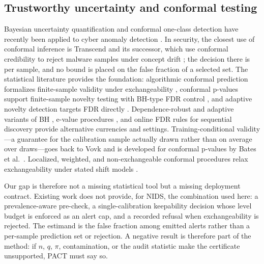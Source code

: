 \documentclass[a4paper,fleqn]{cas-dc}
\newcommand{\PACT}{PACT\xspace}
\begin{document}
\subsection{Trustworthy uncertainty and conformal testing}
Bayesian uncertainty quantification and conformal one-class detection have recently been applied to cyber anomaly detection \cite{yang2024trustworthy,farsimadan2026confid,uq2024nids,comnet2025bayesian}. In security, the closest use of conformal inference is Transcend and its successor, which use conformal credibility to reject malware samples under concept drift \cite{jordaney2017transcend,barbero2022transcending}; the decision there is per sample, and no bound is placed on the false fraction of a selected set. The statistical literature provides the foundation: algorithmic conformal prediction formalizes finite-sample validity under exchangeability \cite{vovk2005algorithmic}, conformal p-values support finite-sample novelty testing with BH-type FDR control \cite{bates2023outliers,benjamini1995controlling}, and adaptive novelty detection targets FDR directly \cite{aos2024adaptive}. Dependence-robust and adaptive variants of BH \cite{benjamini2001yekutieli,storey2002direct,biomet2025null}, e-value procedures \cite{wang2022ebh,bashari2023derandomized,biomet2023evalues,biomet2024evalues}, and online FDR rules for sequential discovery \cite{aos2018onlinefdr} provide alternative currencies and settings. Training-conditional validity---a guarantee for the calibration sample actually drawn rather than on average over draws---goes back to Vovk \cite{vovk2012conditional} and is developed for conformal p-values by Bates et al.\ \cite{bates2023outliers}. Localized, weighted, and non-exchangeable conformal procedures relax exchangeability under stated shift models \cite{biomet2023localized,jrssb2025sets,jrssb2024covshift,jrssb2024doubly,neurips2025nonexchange,biomet2026weighted}.

Our gap is therefore not a missing statistical tool but a missing deployment contract. Existing work does not provide, for NIDS, the combination used here: a prevalence-aware pre-check, a single-calibration keepability decision whose level budget is enforced as an alert cap, and a recorded refusal when exchangeability is rejected. The estimand is the false fraction among emitted alerts rather than a per-sample prediction set or rejection. A negative result is therefore part of the method: if $n$, $q$, $\pi$, contamination, or the audit statistic make the certificate unsupported, \PACT must say so.
\end{document}
